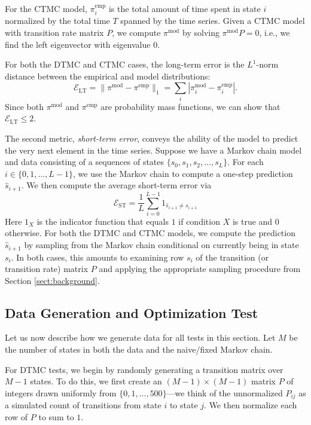 \documentclass[review,letterpaper,11pt]{elsarticle}
\begin{document}
For the CTMC model, $\pi^\text{emp}_i$ is the total amount of time spent in state $i$ normalized by the total time $T$ spanned by the time series.  Given a CTMC model with transition rate matrix $P$, we compute $\pi^\text{mod}$ by solving $\pi^\text{mod} P = 0$, i.e., we find the left eigenvector with eigenvalue $0$.  

For both the DTMC and CTMC cases, the long-term error is the $L^1$-norm distance between the empirical and model distributions:
\begin{equation}
\label{eqn:lterr}
\mathcal{E}_{\text{LT}} = \| \pi^{\text{mod}} - \pi^{\text{emp}} \|_1 = \sum_{i} \left| \pi^{\text{mod}}_i - \pi^{\text{emp}}_i \right|.
\end{equation}
Since both $\pi^\text{mod}$ and $\pi^\text{emp}$ are probability mass functions, we can show that $\mathcal{E}_\text{LT} \leq 2$. 

The second metric, \emph{short-term error}, conveys the ability of the model to predict the very next element in the time series.  Suppose we have a Markov chain model and data consisting of a sequences of states $\{s_0, s_1, s_2, \ldots, s_L\}$.  For each $i \in \{0, 1, \ldots, L-1\}$, we use the Markov chain to compute a one-step prediction $\widehat{s}_{i+1}$.  We then compute the average short-term error via
\begin{equation}
\label{eqn:sterr}
\mathcal{E}_\text{ST} = \frac{1}{L} \sum_{i=0}^{L-1} 1_{\widehat{s}_{i+1} \neq s_{i+1}}
\end{equation}
Here $1_{X}$ is the indicator function that equals $1$ if condition $X$ is true and $0$ otherwise.  For both the DTMC and CTMC models, we compute the prediction $\widehat{s}_{i+1}$ by sampling from the Markov chain conditional on currently being in state $s_i$.  In both cases, this amounts to examining row $s_i$ of the transition (or transition rate) matrix $P$ and applying the appropriate sampling procedure from Section \ref{sect:background}.  

\subsection{Data Generation and Optimization Test}
Let us now describe how we generate data for all tests in this section.  Let $M$ be the number of states in both the data and the naive/fixed Markov chain.

For DTMC tests, we begin by randomly generating a transition matrix over $M-1$ states.  To do this, we first create an $(M-1) \times (M-1)$ matrix $P$ of integers drawn uniformly from $\{0, 1, \ldots, 500\}$---we think of the unnormalized $P_{ij}$ as a simulated count of transitions from state $i$ to state $j$.  We then normalize each row of $P$ to sum to $1$.  
\end{document}
